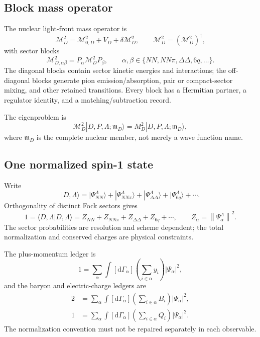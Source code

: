 \documentclass[11pt]{article}
\newcommand{\dd}{\mathrm{d}}
\newcommand{\cM}{\mathcal M}
\newcommand{\norm}[1]{\left\lVert#1\right\rVert}
\newcommand{\NN}{NN}
\newcommand{\NNpi}{NN\pi}
\newcommand{\DD}{\Delta\Delta}
\newcommand{\sixq}{6q}
\begin{document}
\subsection{Block mass operator}

The nuclear light-front mass operator is
\begin{equation}
 \cM_D^2
 =\cM_{0,D}^2+V_D+\delta\cM_D^2,
 \qquad
 \cM_D^2=(\cM_D^2)^\dagger,
\label{eq:nuclear-mass-operator}
\end{equation}
with sector blocks
\begin{equation}
 \cM_{D,\alpha\beta}^2
 =P_\alpha\cM_D^2P_\beta,
 \qquad
 \alpha,\beta\in
 \{\NN,\NNpi,\DD,\sixq,\ldots\}.
\label{eq:nuclear-mass-blocks}
\end{equation}
The diagonal blocks contain sector kinetic energies and interactions; the
off-diagonal blocks generate pion emission/absorption, pair or compact-sector
mixing, and other retained transitions.  Every block has a Hermitian partner,
a regulator identity, and a matching/subtraction record.

The eigenproblem is
\begin{equation}
 \cM_D^2|D,P,\Lambda;\mathfrak m_D\rangle
 =M_D^2|D,P,\Lambda;\mathfrak m_D\rangle,
\label{eq:deuteron-eigenproblem}
\end{equation}
where \(\mathfrak m_D\) is the complete nuclear member, not merely a wave
function name.

\subsection{One normalized spin-1 state}

Write
\begin{equation}
 |D,\Lambda\rangle
 =|\Psi_{\NN}^{\Lambda}\rangle
 +|\Psi_{\NNpi}^{\Lambda}\rangle
 +|\Psi_{\DD}^{\Lambda}\rangle
 +|\Psi_{\sixq}^{\Lambda}\rangle
 +\cdots .
\label{eq:deuteron-fock-expansion}
\end{equation}
Orthogonality of distinct Fock sectors gives
\begin{equation}
 1=\langle D,\Lambda|D,\Lambda\rangle
 =Z_{\NN}+Z_{\NNpi}+Z_{\DD}+Z_{\sixq}+\cdots,
\qquad
 Z_\alpha=\norm{\Psi_\alpha^\Lambda}^2.
\label{eq:sector-normalization}
\end{equation}
The sector probabilities are resolution and scheme dependent; the total
normalization and conserved charges are physical constraints.

The plus-momentum ledger is
\begin{equation}
 1=
 \sum_\alpha
 \int[\dd\Gamma_\alpha]
 \left(\sum_{i\in\alpha}y_i\right)
 |\Psi_\alpha|^2,
\label{eq:nuclear-plus-ledger}
\end{equation}
and the baryon and electric-charge ledgers are
\begin{align}
 2&=
 \sum_\alpha\int[\dd\Gamma_\alpha]
 \left(\sum_{i\in\alpha}B_i\right)|\Psi_\alpha|^2,
\label{eq:nuclear-baryon-ledger}\\
 1&=
 \sum_\alpha\int[\dd\Gamma_\alpha]
 \left(\sum_{i\in\alpha}Q_i\right)|\Psi_\alpha|^2.
\label{eq:nuclear-charge-ledger}
\end{align}
The normalization convention must not be repaired separately in each
observable.
\end{document}
